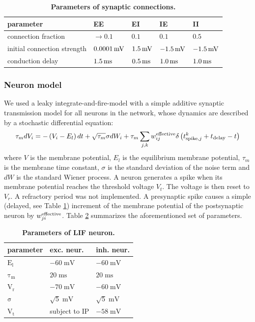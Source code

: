 \documentclass[10pt,letterpaper]{article}
\begin{document}
\begin{table}
\caption{\bf Parameters of synaptic connections.}
\begin{tabular}{|l|l|l|l|l|}
\hline
\textbf{parameter} & \textbf{EE} & \textbf{EI} & \textbf{IE} & \textbf{II} \\ \hline
connection fraction & $\rightarrow 0.1$ & $0.1$ & $0.1$ & $0.5$ \\ \hline
initial connection strength & $\rm 0.0001\, mV$ & $\rm 1.5\, mV$ & $\rm -1.5\, mV$ & $\rm -1.5\, mV$ \\ \hline
conduction delay & $\rm 1.5\, ms$ & $\rm 0.5\, ms$ & $\rm 1.0\, ms$ & $\rm 1.0\, ms$ \\
\hline
\end{tabular}
\label{syn_conn_params}
\end{table}

\subsubsection*{Neuron model}
We used a leaky integrate-and-fire-model with a simple additive synaptic transmission model for all neurons in the network, whose dynamics are described by a stochastic differential equation:
\begin{equation}
{\tau_m}dV_i = -\left( V_i-E_l \right) dt + \sqrt{\tau_m} \sigma dW_i + \tau_m \sum_{j,k} w^{\rm effective}_{ij}\delta \left( t^k_{\mathrm{spike},j} + t_{\rm delay} - t \right)
\label{LIF_Dynamics}
\end{equation}
where $V$ is the membrane potential, $E_l$ is the equilibrium membrane potential, $\tau_m$ is the membrane time constant, $\sigma$ is the standard deviation of the noise term and $dW$ is the standard Wiener process. A neuron generates a spike when its membrane potential reaches the threshold voltage $V_t$. The voltage is then reset to $V_r$. A refractory period was not implemented. A presynaptic spike causes a simple (delayed, see Table \ref{syn_conn_params}) increment of the membrane potential of the postsynaptic neuron by $w^{\rm effective}_{ji}$. Table \ref{LIF_neuron_params} summarizes the aforementioned set of parameters.
\begin{table}
\caption{\bf Parameters of LIF neuron.}
\begin{tabular}{|l|l|l|}
\hline
\textbf{parameter} & \textbf{exc. neur.} & \textbf{inh. neur.}\\ \hline
$\mathrm{E_l}$ & $\mathrm{-60\;mV}$ & $\mathrm{-60\;mV}$ \\ \hline
$\mathrm{\tau_m}$ & $\mathrm{20\;ms}$ & $\mathrm{20\;ms}$ \\ \hline
$\mathrm{V_r}$ & $\mathrm{-70\;mV}$ & $\mathrm{-60\;mV}$ \\ \hline
$\mathrm{\sigma}$ & $\mathrm{\sqrt{5}\;mV}$ & $\mathrm{\sqrt{5}\;mV}$ \\ \hline
$\mathrm{V_t}$ & subject to IP & $\mathrm{-58\;mV}$ \\ 
\hline
\end{tabular}
\label{LIF_neuron_params}
\end{table}
\end{document}
